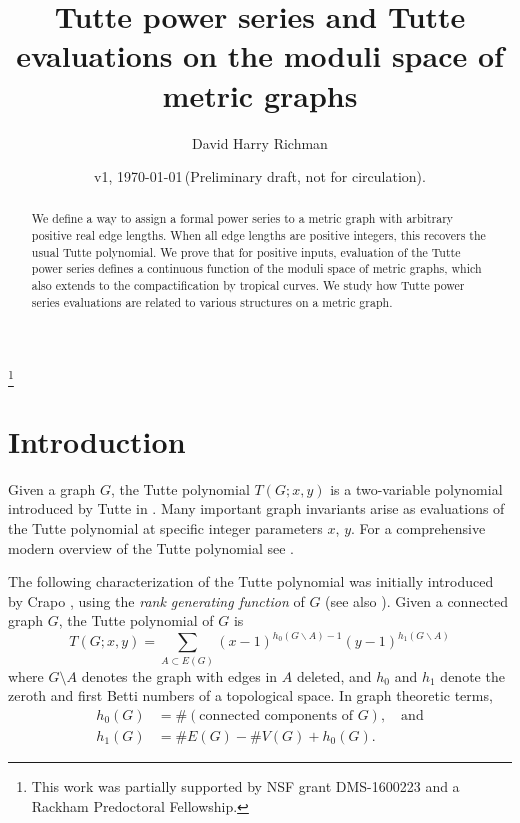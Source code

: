 \documentclass{amsart}
\theoremstyle{definition}
\begin{document}
\title[Tutte power series on metric graphs]{Tutte power series and Tutte evaluations on the moduli space of metric graphs}
\author{David Harry Richman}
\date{v1, \today  \,(Preliminary draft, not for circulation).}
\thanks{This work was partially supported by NSF grant DMS-1600223
and a Rackham Predoctoral Fellowship.}


\begin{abstract}
We define a way to assign a formal power series to a metric graph with arbitrary positive real edge lengths.
When all edge lengths are positive integers,
this recovers the usual Tutte polynomial.
We prove that for positive inputs, evaluation of the Tutte power series
defines a continuous function of the moduli space of metric graphs,
which also extends to the compactification by tropical curves.
We study how Tutte power series evaluations are
related to various structures on a metric graph.
\end{abstract}
\maketitle


\section{Introduction}
Given a graph $G$,
the Tutte polynomial $T(G;x,y)$ 
is 
 a two-variable polynomial %
introduced by Tutte in \cite{Tut}.
Many important graph invariants arise as evaluations of 
the Tutte polynomial %
at specific integer parameters $x$, $y$.
For a comprehensive modern overview of the Tutte polynomial see \cite{BO, EMM}.

The following characterization of the Tutte polynomial was initially introduced by Crapo \cite{Cra}, 
using the  {\em rank generating function} of $G$
(see also \cite[Definition 3]{EMM}).
Given a connected graph $G $, 
the Tutte polynomial of $G$ is 
\begin{equation}
\label{eq:tutte-graph}
T(G; x,y) = \sum_{A \subset E(G)} (x-1)^{h_0(G\backslash A) - 1}(y-1)^{h_1(G\backslash A)}
\end{equation}
where $G\setminus A$ denotes the graph with edges in $A$ deleted,
and $h_0$ and $h_1$ denote the zeroth and first Betti numbers of 
a topological space.
In graph theoretic terms,
\begin{align*}
h_0(G) &= \#(\text{connected components of }G), \quad\text{and}\\
h_1(G) &= \# E(G) - \# V(G) + h_0(G) .
\end{align*}
\end{document}
